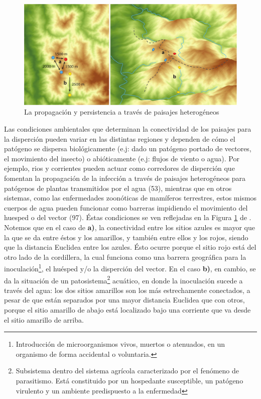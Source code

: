   \begin{figure}
  \centering%
  \includegraphics[width=1\textwidth]{images/paisajes_heterogeneos}%
  \caption{La propagación y persistencia a través de paisajes heterogéneos}\label{fig:paisajes_h}
  \end{figure}

\par Las condiciones ambientales que determinan la conectividad de los paisajes
  para la disperción pueden variar en las distintas regiones y dependen de cómo
  el patógeno se dispersa biológicamente (e.j: dado un patógeno portado de
  vectores, el movimiento del insecto) o abióticamente (e.j: flujos de viento o agua).
  Por ejemplo, rios y corrientes pueden actuar como corredores de disperción que
  fomentan la propagación de la infección a través de paisajes heterogéneos
  para patógenos de plantas transmitidos por el agua (53), mientras que en otros
  sistemas, como las enfermedades zoonóticas de mamíferos terrestres, estos mismos
  cuerpos de agua pueden funcionar como barreras impidiendo el movimiento
  del huesped o del vector (97). Éstas condiciones se ven reflejadas en la
  Figura \ref{fig:paisajes_h} de \cite{Landscape Epidemiology of Emerging Infectious...}. Notemos que en el caso de \textbf{a)}, la
  conectividad entre los sitios azules es mayor que la que se da entre éstos y
  los amarillos, y también entre ellos y los rojos, siendo que la distancia
  Euclidea entre los azules. Ésto ocurre porque el sitio rojo está del otro lado
  de la cordillera, la cual funciona como una barrera geográfica para la
  inoculación\footnote{Introducción de microorganismos vivos, muertos o atenuados,
  en un organismo de forma accidental o voluntaria.}, el huésped y/o la disperción
  del vector. En el caso \textbf{b)}, en cambio, se da la situación de un
  patosistema\footnote{Subsistema dentro del sistema agrícola caracterizado por el
  fenómeno de parasitismo. Está constituido por un hospedante susceptible,
  un patógeno virulento y un ambiente predispuesto a la enfermedad} acuático, en
  donde la inoculación sucede a través del agua: los dos sitios amarillos son los
  más estrechamente conectados, a pesar de que están separados por una mayor
  distancia Euclidea que con otros, porque el sitio amarillo de abajo está localizado
  bajo una corriente que va desde el sitio amarillo de arriba.

